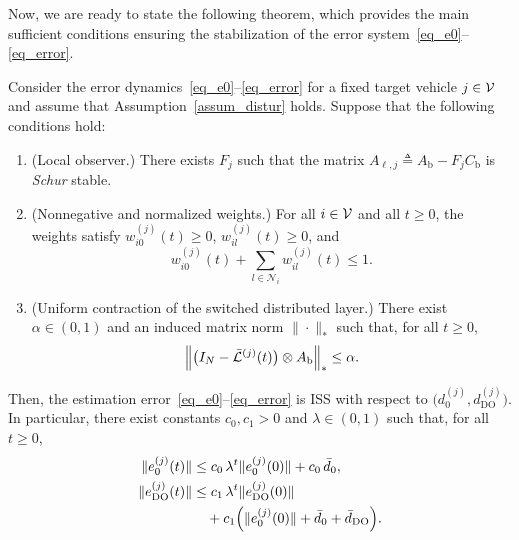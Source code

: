 Now, we are ready to state the following theorem, which provides the main sufficient conditions ensuring the stabilization of the error system~\eqref{eq_e0}--\eqref{eq_error}.
\begin{theorem}\label{thm_observer}
Consider the error dynamics~\eqref{eq_e0}--\eqref{eq_error} for a fixed target vehicle $j\in\mathcal{V}$ and assume that Assumption~\ref{assum_distur} holds. Suppose that the following conditions hold:
\begin{enumerate}
    \item (Local observer.) There exists $F_{j}$ such that the matrix
    $A_{\ell,j}\triangleq A_{\text{b}} - F_{j}C_{\text{b}}$ is {\it Schur} stable.
    \item (Nonnegative and normalized weights.) For all $i \in \mathcal{V}$ and all $t\ge 0$, the weights satisfy $w_{i0}^{(j)}(t)\ge 0$, $w_{il}^{(j)}(t)\ge 0$, and
    \begin{equation}\label{thm_W}
    w_{i0}^{(j)}(t)+\sum_{l\in \mathcal{N}_i} w_{il}^{(j)}(t) \leq 1.
    \end{equation}
    \item (Uniform contraction of the switched distributed layer.) There exist $\alpha \in (0,1)$ and an induced matrix norm $\| \cdot \|_*$ such that, for all $t\ge 0$,
	\begin{equation} \label{assume3}
        \Big\| \big( I_{N} - \bar{\mathcal{L}}^{(j)}(t) \big)  \otimes  A_{\text{b}} \Big\|_* \leq \alpha.
	\end{equation}
\end{enumerate}
Then, the estimation error~\eqref{eq_e0}--\eqref{eq_error} is ISS with respect to $\big(d_0^{(j)},d_{\mathrm{DO}}^{(j)}\big)$. In particular, there exist constants $c_0, c_1 > 0$ and $\lambda \in (0,1)$ such that, for all $t\ge 0$,
\begin{align}
\|e_0^{(j)}(t)\| &\le c_0\,\lambda^t \|e_0^{(j)}(0)\| + c_0\,\bar{d}_{0},\\
\|e_{\mathrm{DO}}^{(j)}(t)\| &\le c_1\,\lambda^t \|e_{\mathrm{DO}}^{(j)}(0)\| \notag\\
&\quad+ c_1 \Big(\|e_0^{(j)}(0)\| + \bar{d}_{0} + \bar{d}_{\mathrm{DO}}\Big).
\end{align}
\end{theorem}

